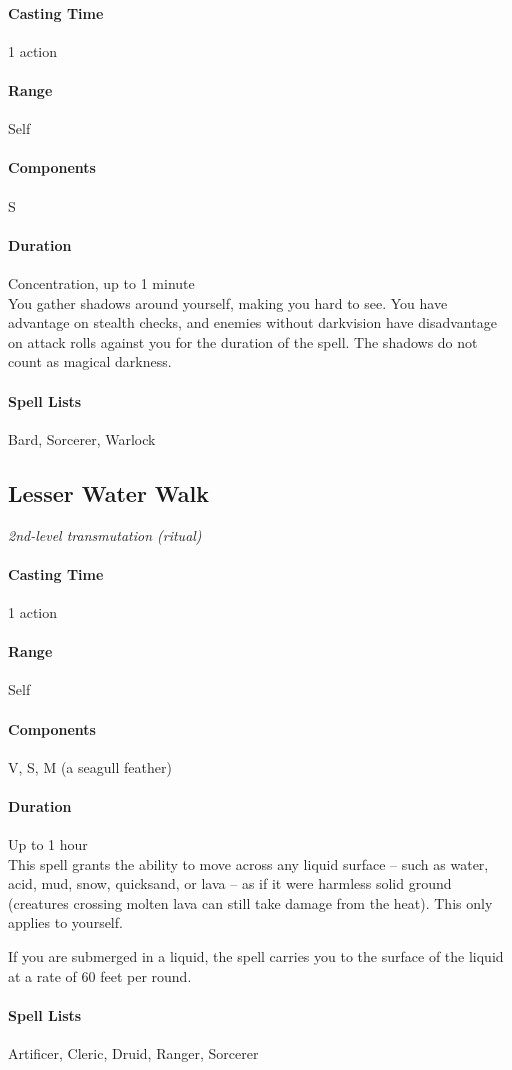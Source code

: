\paragraph{Casting Time} 1 action
\paragraph{Range} Self
\paragraph{Components} S
\paragraph{Duration} Concentration, up to 1 minute\\
\hfill \break
You gather shadows around yourself, making you hard to see. You have advantage on stealth checks, and enemies without darkvision have disadvantage on attack rolls against you for the duration of the spell. The shadows do not count as magical darkness.
\hfill \break
\paragraph{Spell Lists} Bard, Sorcerer, Warlock


\subsection{Lesser Water Walk}
\textit{2nd-level transmutation (ritual)}
\hfill \break
\paragraph{Casting Time} 1 action
\paragraph{Range} Self
\paragraph{Components} V, S, M (a seagull feather)
\paragraph{Duration} Up to 1 hour\\
\hfill \break
This spell grants the ability to move across any liquid surface – such as water, acid, mud, snow, quicksand, or lava – as if it were harmless solid ground (creatures crossing molten lava can still take damage from the heat). This only applies to yourself.

If you are submerged in a liquid, the spell carries you to the surface of the liquid at a rate of 60 feet per round.
\hfill \break
\paragraph{Spell Lists} Artificer, Cleric, Druid, Ranger, Sorcerer